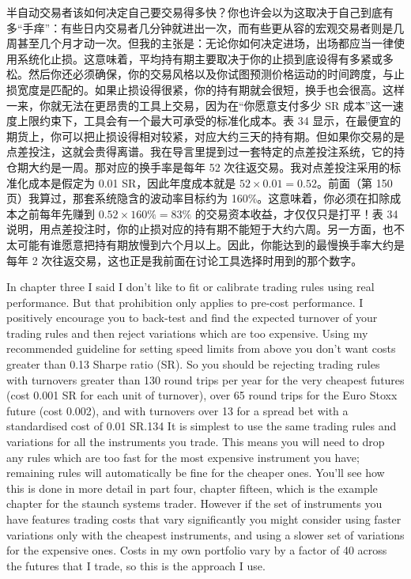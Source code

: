\begin{chineseblock}半自动交易者该如何决定自己要交易得多快？你也许会以为这取决于自己到底有多“手痒”：有些日内交易者几分钟就进出一次，而有些更从容的宏观交易者则是几周甚至几个月才动一次。但我的主张是：无论你如何决定进场，出场都应当一律使用系统化止损。这意味着，平均持有期主要取决于你的止损到底设得有多紧或多松。然后你还必须确保，你的交易风格以及你试图预测价格运动的时间跨度，与止损宽度是匹配的。如果止损设得很紧，你的持有期就会很短，换手也会很高。这样一来，你就无法在更昂贵的工具上交易，因为在“你愿意支付多少 SR 成本”这一速度上限约束下，工具会有一个最大可承受的标准化成本。表 34 显示，在最便宜的期货上，你可以把止损设得相对较紧，对应大约三天的持有期。但如果你交易的是点差投注，这就会贵得离谱。我在导言里提到过一套特定的点差投注系统，它的持仓期大约是一周。那对应的换手率是每年 52 次往返交易。我对点差投注采用的标准化成本是假定为 0.01 SR，因此年度成本就是 \(52 \times 0.01 = 0.52\)。前面（第 150 页）我算过，那套系统隐含的波动率目标约为 160\%。这意味着，你必须在扣除成本之前每年先赚到 \(0.52 \times 160\% = 83\%\) 的交易资本收益，才仅仅只是打平！表 34 说明，用点差投注时，你的止损对应的持有期不能短于大约六周。另一方面，也不太可能有谁愿意把持有期放慢到六个月以上。因此，你能达到的最慢换手率大约是每年 2 次往返交易，这也正是我前面在讨论工具选择时用到的那个数字。\end{chineseblock}



\begin{englishblock} In chapter three I said I don't like to fit or calibrate trading rules using real performance. But that prohibition only applies to pre-cost performance. I positively encourage you to back-test and find the expected turnover of your trading rules and then reject variations which are too expensive. Using my recommended guideline for setting speed limits from above you don't want costs greater than 0.13 Sharpe ratio (SR). So you should be rejecting trading rules with turnovers greater than 130 round trips per year for the very cheapest futures (cost 0.001 SR for each unit of turnover), over 65 round trips for the Euro Stoxx future (cost 0.002), and with turnovers over 13 for a spread bet with a standardised cost of 0.01 SR.134 It is simplest to use the same trading rules and variations for all the instruments you trade. This means you will need to drop any rules which are too fast for the most expensive instrument you have; remaining rules will automatically be fine for the cheaper ones. You'll see how this is done in more detail in part four, chapter fifteen, which is the example chapter for the staunch systems trader. However if the set of instruments you have features trading costs that vary significantly you might consider using faster variations only with the cheapest instruments, and using a slower set of variations for the expensive ones. Costs in my own portfolio vary by a factor of 40 across the futures that I trade, so this is the approach I use. \end{englishblock}


